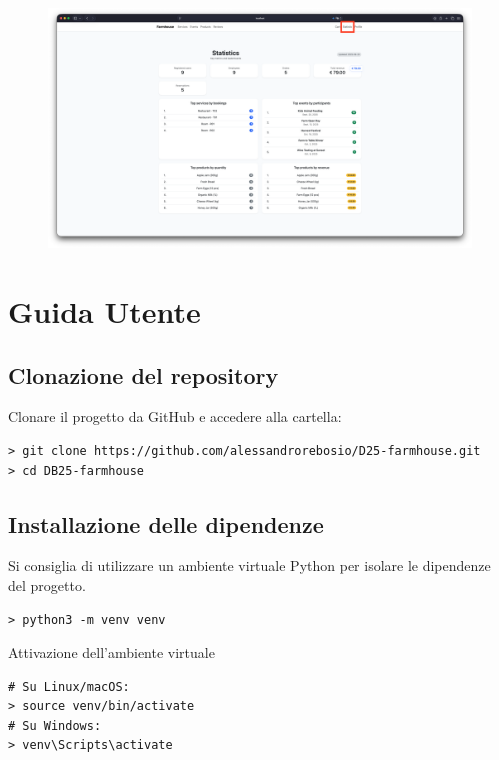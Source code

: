 \documentclass[a4paper,12pt]{report}
\begin{document}
\begin{figure}[H]
    \centering
    \includegraphics[width=\textwidth, trim=0 0 0 0]{./img/admin/statistic.png}
    \vspace{-1em}
    \label{fig:statistiche}
\end{figure}

\appendix
\chapter{Guida Utente}

\section{Clonazione del repository}
Clonare il progetto da GitHub e accedere alla cartella:

\begin{verbatim}
> git clone https://github.com/alessandrorebosio/D25-farmhouse.git
> cd DB25-farmhouse
\end{verbatim}

\section{Installazione delle dipendenze}

Si consiglia di utilizzare un ambiente virtuale Python per isolare le dipendenze del progetto.

\begin{verbatim}
> python3 -m venv venv
\end{verbatim}

\noindent Attivazione dell'ambiente virtuale
\begin{verbatim}
# Su Linux/macOS:
> source venv/bin/activate
# Su Windows:
> venv\Scripts\activate
\end{verbatim}
\end{document}
